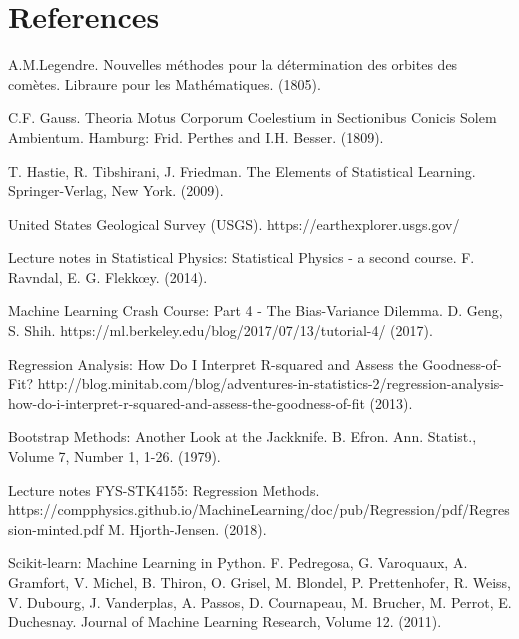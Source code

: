 \newpage
\section{References}

\begingroup
\renewcommand{\section}[2]{}
\begin{thebibliography}{}
	A.M.Legendre. 
	Nouvelles méthodes pour la détermination des orbites des comètes.
	Libraure pour les Mathématiques.
	(1805).
	
	C.F. Gauss. 
	Theoria Motus Corporum Coelestium in Sectionibus Conicis Solem Ambientum. 
	Hamburg: Frid. Perthes and I.H. Besser.
	(1809).
	
	T. Hastie, R. Tibshirani, J. Friedman.
	The Elements of Statistical Learning.
	Springer-Verlag, New York.
	(2009).
	
	United States Geological Survey (USGS).
	https://earthexplorer.usgs.gov/
	
	Lecture notes in Statistical Physics: Statistical Physics - a second course.
	F. Ravndal, E. G. Flekk\oe y.
	(2014).
	
	Machine Learning Crash Course: Part 4 - The Bias-Variance Dilemma.
	D. Geng, S. Shih.
	https://ml.berkeley.edu/blog/2017/07/13/tutorial-4/
	(2017).
	
	Regression Analysis: How Do I Interpret R-squared and Assess the Goodness-of-Fit?
	http://blog.minitab.com/blog/adventures-in-statistics-2/regression-analysis-how-do-i-interpret-r-squared-and-assess-the-goodness-of-fit
	(2013).
	
	Bootstrap Methods: Another Look at the Jackknife.
	B. Efron. 
	Ann. Statist., Volume 7, Number 1, 1-26.
	(1979).
	
	Lecture notes FYS-STK4155: Regression Methods.
	https://compphysics.github.io/MachineLearning/doc/pub/Regression/pdf/Regression-minted.pdf
	M. Hjorth-Jensen.
	(2018).
	
	Scikit-learn: Machine Learning in Python.
	F. Pedregosa, G. Varoquaux, A. Gramfort, V. Michel, B. Thiron, O. Grisel, M. Blondel, P. Prettenhofer, R. Weiss, V. Dubourg, J. Vanderplas, A. Passos, D. Cournapeau, M. Brucher, M. Perrot, E. Duchesnay.
    Journal of Machine Learning Research, Volume 12.
	(2011).
	
\end{thebibliography}
\endgroup